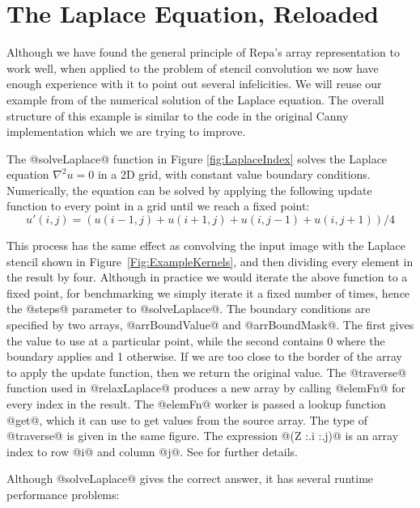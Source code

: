 
\pagebreak{}
\section{The Laplace Equation, Reloaded}
\label{sec:Laplace}
Although we have found the general principle of Repa's array representation to work well, when applied to the problem of stencil convolution we now have enough experience with it to point out several infelicities. We will reuse our example from \cite{Keller:repa} of the numerical solution of the Laplace equation. The overall structure of this example is similar to the code in the original Canny implementation which we are trying to improve.

The @solveLaplace@ function in Figure \ref{fig:LaplaceIndex} solves the Laplace equation $\nabla^2u=0$ in a 2D grid, with constant value boundary conditions. Numerically, the equation can be solved by applying the following update function to every point in a grid until we reach a fixed point: 
$$
u'(i,j) = (u(i - 1, j) + u(i + 1, j) + u(i, j - 1) + u(i, j + 1)) / 4
$$ 

This process has the same effect as convolving the input image with the Laplace stencil shown in Figure~\ref{Fig:ExampleKernels}, and then dividing every element in the result by four. Although in practice we would iterate the above function to a fixed point, for benchmarking we simply iterate it a fixed number of times, hence the @steps@ parameter to @solveLaplace@. The boundary conditions are specified by two arrays, @arrBoundValue@ and @arrBoundMask@. The first gives the value to use at a particular point, while the second contains 0 where the boundary applies and 1 otherwise. If we are too close to the border of the array to apply the update function, then we return the original value. The @traverse@ function used in @relaxLaplace@ produces a new array by calling @elemFn@ for every index in the result. The @elemFn@ worker is passed a lookup function @get@, which it can use to get values from the source array. The type of @traverse@ is given in the same figure. The expression @(Z :.i :.j)@ is an array index to row @i@ and column @j@. See \cite{Keller:repa} for further details.

Although @solveLaplace@ gives the correct answer, it has several runtime performance problems:

